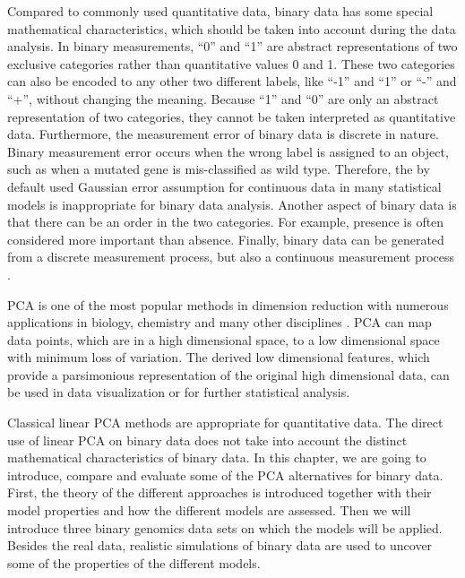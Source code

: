 Compared to commonly used quantitative data, binary data has some special mathematical characteristics, which should be taken into account during the data analysis. In binary measurements, ``0'' and ``1'' are abstract representations of two exclusive categories rather than quantitative values 0 and 1. These two categories can also be encoded to any other two different labels, like ``-1'' and ``1'' or ``-'' and ``+'', without changing the meaning. Because ``1'' and ``0'' are only an abstract representation of two categories, they cannot be taken interpreted as quantitative data. Furthermore, the measurement error of binary data is discrete in nature. Binary measurement error occurs when the wrong label is assigned to an object, such as when a mutated gene is mis-classified as wild type. Therefore, the by default used Gaussian error assumption for continuous data in many statistical models is inappropriate for binary data analysis. Another aspect of binary data is that there can be an order in the two categories. For example, presence is often considered more important than absence. Finally, binary data can be generated from a discrete measurement process, but also a continuous measurement process \cite{young1980quantifying}.

PCA is one of the most popular methods in dimension reduction with numerous applications in biology, chemistry and many other disciplines \cite{jolliffe2002principal}. PCA can map data points, which are in a high dimensional space, to a low dimensional space with minimum loss of variation. The derived low dimensional features, which provide a parsimonious representation of the original high dimensional data, can be used in data visualization or for further statistical analysis.

Classical linear PCA methods are appropriate for quantitative data. The direct use of linear PCA on binary data does not take into account the distinct mathematical characteristics of binary data. In this chapter, we are going to introduce, compare and evaluate some of the PCA alternatives for binary data. First, the theory of the different approaches is introduced together with their model properties and how the different models are assessed. Then we will introduce three binary genomics data sets on which the models will be applied. Besides the real data, realistic simulations of binary data are used to uncover some of the properties of the different models.

